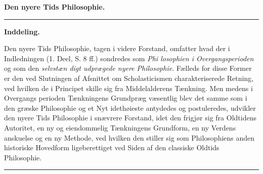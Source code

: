 \documentclass[12pt,a4paper]{book}
\newcommand{\divrule}{\begin{center}\rule{2cm}{0.4pt}\end{center}}
\begin{document}
\begin{center}
  \textbf{\large Den nyere Tids Philosophie.}
\end{center}

\divrule

\begin{center}
  \textbf{Inddeling.}
\end{center}

Den nyere Tids Philosophie, tagen i videre Forstand, omfatter
hvad der i Indledningen (1. Deel, S. 8 ff.) sondredes som \emph{Phi\-%
losophien i Overgangsperioden} og som den \emph{selvstæn\-%
digt udprægede nyere Philosophie}. Fælleds for disse
Former er den ved Slutningen af Afsnittet om Scholasticismen
charakteriserede Retning, ved hvilken de i Principet skille
sig fra Middelalderens Tænkning. Men medens i Overgangs\-%
perioden Tænkningens Grundpræg væsentlig blev det samme
som i den græske Philosophie og et Nyt idethøieste antydedes
og postuleredes, udvikler den nyere Tids Philosophie i snævrere
Forstand, idet den frigjør sig fra Oldtidens Autoritet, en ny
og eiendommelig Tænkningens Grundform, en ny Verdens\-%
anskuelse og en ny Methode, ved hvilken den stiller sig som
Philosophiens anden historiske Hovedform ligeberettiget ved
Siden af den classiske Oldtids Philosophie.

\divrule

\end{document}
